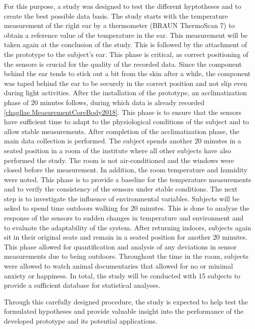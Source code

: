For this purpose, a study was designed to test the different hyptotheses and to create the best possible data basis. 
The study starts with the temperature measurement of the right ear by a thermometer (BRAUN ThermoScan 7) to obtain a reference value of the temperature in the ear. 
This measurement will be taken again at the conclusion of the study.
This is followed by the attachment of the prototype to the subject's ear. This phase is critical, as correct positioning of the sensors is crucial for the quality of the recorded data.
Since the component behind the ear tends to stick out a bit from the skin after a while, the component was taped behind the ear to be securely in the correct position and not slip even during light activities. 
After the installation of the prototype, an acclimatization phase of 20 minutes follows, during which data is already recorded \ref{chagllae.MeasurementCoreBody2018}. 
This phase is to ensure that the sensors have sufficient time to adapt to the physiological conditions of the subject and to allow stable measurements.
After completion of the acclimatization phase, the main data collection is performed. 
The subject spends another 20 minutes in a seated position in a room of the institute where all other subjects have also performed the study. 
The room is not air-conditioned and the windows were closed before the measurement.
In addition, the room temperature and humidity were noted. 
This phase is to provide a baseline for the temperature measurements and to verify the consistency of the sensors under stable conditions.
The next step is to investigate the influence of environmental variables. 
Subjects will be asked to spend time outdoors walking for 20 minutes. 
This is done to analyze the response of the sensors to sudden changes in temperature and environment and to evaluate the adaptability of the system.
After returning indoors, subjects again sit in their original seats and remain in a seated position for another 20 minutes. 
This phase allowed for quantification and analysis of any deviations in sensor measurements due to being outdoors.
Throughout the time in the room, subjects were allowed to watch animal documentaries that allowed for no or minimal anxiety or happiness. 
In total, the study will be conducted with 15 subjects to provide a sufficient database for statistical analyses.

Through this carefully designed procedure, the study is expected to help test the formulated hypotheses and provide valuable insight into the performance of the developed prototype and its potential applications.


